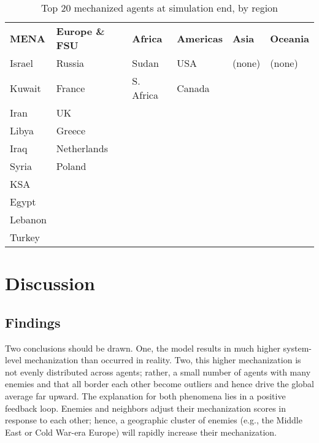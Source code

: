 \documentclass{article}
\begin{document}
\begin{table}[h]
	\centering
	\caption{Top 20 mechanized agents at simulation end, by region}
	\begin{tabular}{|l l l l l l|}
		\hline
		\textbf{MENA} & \textbf{Europe \& FSU} & \textbf{Africa} & \textbf{Americas} & \textbf{Asia} & \textbf{Oceania} \\
		Israel       & Russia         & Sudan        & USA    & (none) & (none) \\
		Kuwait       & France         & S. Africa    & Canada &        &        \\
		Iran         & UK             &              &        &        &        \\
		Libya        & Greece         &              &        &        &        \\
		Iraq         & Netherlands    &              &        &        &        \\
		Syria        & Poland         &              &        &        &        \\
		KSA          &                &              &        &        &        \\
		Egypt        &                &              &        &        &        \\
		Lebanon      &                &              &        &        &        \\
		Turkey       &                &              &        &        &        \\
		\hline
	\end{tabular}
\end{table}

\section{Discussion}

\subsection{Findings}

Two conclusions should be drawn. One, the model results in much higher
system-level mechanization than occurred in reality. Two, this higher
mechanization is not evenly distributed across agents; rather, a small number of
agents with many enemies and that all border each other become outliers and
hence drive the global average far upward. The explanation for both phenomena
lies in a positive feedback loop. Enemies and neighbors adjust their
mechanization scores in response to each other; hence, a geographic cluster of
enemies (e.g., the Middle East or Cold War-era Europe) will rapidly increase their
mechanization.
\end{document}
